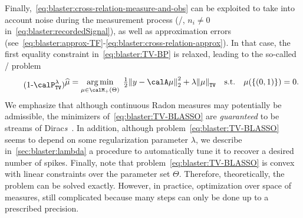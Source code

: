 \mynewline
Finally,~\cref{eq:blaster:cross-relation-measure-and-obs} can be exploited to take into account noise during the measurement process (\ie/,  $n_i\neq0$ in~\cref{eq:blaster:recordedSignal}), as well as approximation errors  (see~\cref{eq:blaster:approx-TF}-\cref{eq:blaster:cross-relation-approx}).
In that case, the first equality constraint in~\eqref{eq:blaster:TV-BP} is relaxed, leading to the so-called \BLASSO/ problem
\begin{equation}
    \stepcounter{equation}
    \tag{\theequation-$\calP^\lambda_{\text{\texttt{TV}}}$}
    \label{eq:blaster:TV-BLASSO}
    \begin{split}
    \widehat{\mu}
    =
    \kargmin_{\mu \in\posDisRadonMeasure}
    \;
    \tfrac{1}{2} \kvvbar{
        y - \opObs\mu
    }_2^2
    +
    \lambda\normTV{
        \mu
    }
    \quad
    \text{s.t.}
    \quad
    \mu(\{(0, 1)\}) = 0
    .
    \end{split}
\end{equation}
We emphasize that although continuous Radon measures may potentially be admissible, the minimizers of~\cref{eq:blaster:TV-BLASSO} are \emph{guaranteed} to be streams of Dirac\textit{s}~.
In addition, although problem~\cref{eq:blaster:TV-BLASSO} seems to depend on some regularization parameter $\lambda$, we describe in~\cref{sec:blaster:lambda} a procedure to automatically tune it to recover a desired number of spikes.
Finally, note that problem~\cref{eq:blaster:TV-BLASSO} is convex with linear constraints over the parameter set $\Theta$.
Therefore, theoretically, the problem can be solved exactly.
However, in practice, optimization over space of measures, still complicated because many steps can only be done up to a prescribed precision.

